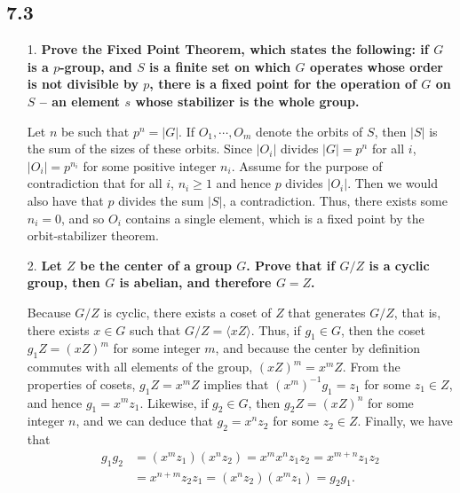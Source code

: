 \documentclass[a4paper,12pt]{article}
\begin{document}
\subsection*{7.3}
\begin{enumerate}
    \item[1.]
        \boldmath
        \textbf{Prove the Fixed Point Theorem, which states the following: if $G$ is a $p$-group, and $S$ is a finite set on which $G$ operates whose order is not divisible by $p$, there is a fixed point for the operation of $G$ on $S$ -- an element $s$ whose stabilizer is the whole group.} \par
        \unboldmath
        Let $n$ be such that $p^n = |G|$. If $O_1, \cdots, O_m$ denote the orbits of $S$, then $|S|$ is the sum of the sizes of these orbits. Since $|O_i|$ divides $|G| = p^n$ for all $i$, $|O_i| = p^{n_i}$ for some positive integer $n_i$. Assume for the purpose of contradiction that for all $i$, $n_i \geq 1$ and hence $p$ divides $|O_i|$. Then we would also have that $p$ divides the sum $|S|$, a contradiction. Thus, there exists some $n_i = 0$, and so $O_i$ contains a single element, which is a fixed point by the orbit-stabilizer theorem.

    \item[2.]
        \boldmath
        \textbf{Let $Z$ be the center of a group $G$. Prove that if $G/Z$ is a cyclic group, then $G$ is abelian, and therefore $G = Z$.} \par
        \unboldmath
        Because $G/Z$ is cyclic, there exists a coset of $Z$ that generates $G/Z$, that is, there exists $x \in G$ such that $G/Z = \langle xZ \rangle$. Thus, if $g_1 \in G$, then the coset $g_1 Z = (xZ)^m$ for some integer $m$, and because the center by definition commutes with all elements of the group, $(xZ)^m = x^m Z$. From the properties of cosets, $g_1 Z = x^m Z$ implies that $(x^m)^{-1} g_1 = z_1$ for some $z_1 \in Z$, and hence $g_1 = x^m z_1$. Likewise, if $g_2 \in G$, then $g_2 Z = (xZ)^n$ for some integer $n$, and we can deduce that $g_2 = x^n z_2$ for some $z_2 \in Z$. Finally, we have that
        \begin{align*}
            g_1 g_2 &= (x^m z_1) (x^n z_2) = x^m x^n z_1 z_2 = x^{m + n} z_1 z_2 \\
            &= x^{n + m} z_2 z_1 = (x^n z_2) (x^m z_1) = g_2 g_1.
        \end{align*}


\end{enumerate}
\end{document}
